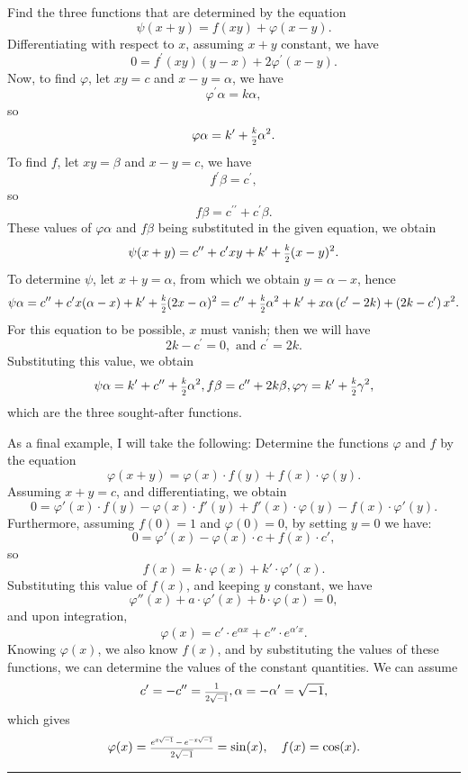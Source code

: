 \documentclass[oneside, 12 pt, leqno]{memoir}
\let\oldfrac\frac
\def\frac#1#2{\mathchoice{\text{\scalebox{.83}{${\oldfrac{#1}{#2}}$}}}{\text{\scalebox{.83}{${\displaystyle\oldfrac{#1}{#2}}$}}}{\genfrac{}{}{}{2}{#1}{#2}}{\genfrac{}{}{}{3}{#1}{#2}}}
\begin{document}
%
Find the three functions that are determined by the equation
\[\psi(x+y)=f(x y)+\varphi(x-y). \]
Differentiating with respect to \(x\), assuming \(x+y\) constant, we have
\[0=f^{\prime}(x y)(y-x)+2 \varphi^{\prime}(x-y).\]
Now, to find \(\varphi\), let \(x y=c\) and \(x-y=\alpha\), we have
\[\varphi^{\prime} \alpha=k \alpha,\]
so
\[\varphi \alpha=k^{\prime}+\frac{k}{2} \alpha^2.\]
To find \(f\), let \(x y=\beta\) and \(x-y=c\), we have
\[f^{\prime} \beta=c^{\prime},\]
so
\[f \beta=c^{\prime \prime}+c^{\prime} \beta.\]
These values of \(\varphi \alpha\) and \(f \beta\) being substituted in the given equation, we obtain
\[\psi(x+y)=c^{\prime \prime}+c^{\prime} x y+k^{\prime}+\frac{k}{2}(x-y)^2.\]
To determine \(\psi\), let \(x+y=\alpha\), from which we obtain \(y=\alpha-x\), hence
\[\psi \alpha=c^{\prime \prime}+c^{\prime} x(\alpha-x)+k^{\prime}+\frac{k}{2}(2 x-\alpha)^2=c^{\prime \prime}+\frac{k}{2} \alpha^2+k^{\prime}+x \alpha\left(c^{\prime}-2 k\right)+\left(2 k-c^{\prime}\right) x^2.\]
For this equation to be possible, \(x\) must vanish; then we will have
\[2 k-c^{\prime}=0, \text { and } c^{\prime}=2 k.\]
Substituting this value, we obtain
\[
\psi \alpha=k^{\prime}+c^{\prime \prime}+\frac{k}{2} \alpha^2, f \beta=c^{\prime \prime}+2 k \beta, \varphi \gamma=k^{\prime}+\frac{k}{2} \gamma^2,
\]
which are the three sought-after functions. %

%
As a final example, I will take the following: Determine the functions \(\varphi\) and \(f\) by the equation
\[\varphi(x+y)=\varphi(x) \cdot f(y)+f(x) \cdot \varphi(y).\]
Assuming \(x+y=c\), and differentiating, we obtain
\[0=\varphi'(x) \cdot f(y)-\varphi(x) \cdot f'(y)+f'(x) \cdot \varphi(y)-f(x) \cdot \varphi'(y).\]
Furthermore, assuming \(f(0)=1\) and \(\varphi(0)=0\), by setting \(y=0\) we have:
\[0=\varphi'(x)-\varphi(x) \cdot c+f(x) \cdot c',\]
so
\[f(x)= k \cdot \varphi(x)+k' \cdot \varphi'(x).\]
Substituting this value of \(f(x)\), and keeping \(y\) constant, we have
\[\varphi''(x)+a \cdot \varphi'(x)+b \cdot \varphi(x)=0,\]
and upon integration,
\[\varphi(x)=c' \cdot e^{\alpha x}+c'' \cdot e^{\alpha' x}.\]
Knowing \(\varphi(x)\), we also know \(f(x)\), and by substituting the values of these functions, we can determine the values of the constant quantities. We can assume
\[c'=-c''=\frac{1}{2 \sqrt{-1}}, \alpha=-\alpha'=\sqrt{-1},\]
which gives
\[\varphi(x)=\frac{e^{x \sqrt{-1}}-e^{-x \sqrt{-1}}}{2 \sqrt{-1}}=\sin(x), \quad f(x)=\cos(x).\]
\begin{center}
\rule{2in}{0.1pt}
\end{center}
\end{document}
